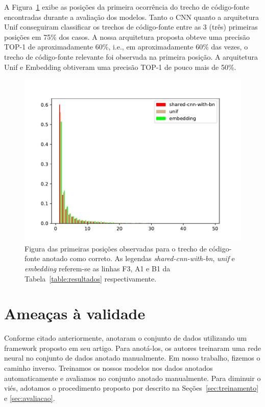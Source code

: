 A Figura~\ref{fig:histogram-mrr} exibe as posições da primeira ocorrência do trecho de código-fonte encontradas durante a avaliação dos modelos. Tanto o CNN quanto a arquitetura Unif conseguiram classificar os trechos de código-fonte entre as 3 (três) primeiras posições em 75\% dos casos. A nossa arquitetura proposta obteve uma precisão TOP-1 de aproximadamente 60\%, i.e., em aproximadamente 60\% das vezes, o trecho de código-fonte relevante foi observada na primeira posição. A arquitetura Unif e Embedding obtiveram uma precisão TOP-1 de pouco mais de 50\%. 


\begin{figure}[h]
    \centering
    \includegraphics[width=1\textwidth]{figuras/cap-resultados/histogram.pdf}
    \caption{Figura das primeiras posições observadas para o trecho de código-fonte anotado como correto. As legendas \emph{shared-cnn-with-bn}, \emph{unif} e \emph{embedding} referem-se as linhas F3, A1 e B1 da Tabela~\ref{table:resultados} respectivamente.}
    \label{fig:histogram-mrr}
\end{figure}






\section{Ameaças à validade}

Conforme citado anteriormente, \cite{yao-2018} anotaram o conjunto de dados utilizando um framework proposto em seu artigo. Para anotá-los, os autores treinaram uma rede neural no conjunto de dados anotado manualmente. Em nosso trabalho, fizemos o caminho inverso. Treinamos os nossos modelos nos dados anotados automaticamente e avaliamos no conjunto anotado manualmente. Para diminuir o viés, adotamos o procedimento proposto por \cite{iyer-etal-2016-summarizing} descrito na Seções~\ref{sec:treinamento} e \ref{sec:avaliacao}.


